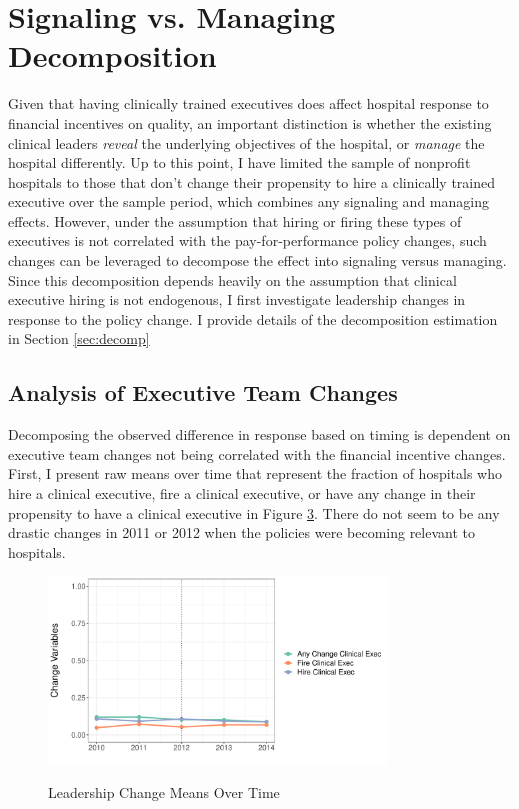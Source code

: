 \documentclass[12pt]{article}
\begin{document}
\begin{figure}[ht!]
\begin{subfigure}[b]{0.45\textwidth}
         \label{fig:mort_synth_plotc}
     \end{subfigure}
        \label{fig:mort_synth_plot}
    \end{figure}
    

\section{Signaling vs. Managing Decomposition}\label{sec:sig_man}

    Given that having clinically trained executives does affect hospital response to financial incentives on quality, an important distinction is whether the existing clinical leaders \textit{reveal} the underlying objectives of the hospital, or \textit{manage} the hospital differently. Up to this point, I have limited the sample of nonprofit hospitals to those that don't change their propensity to hire a clinically trained executive over the sample period, which combines any signaling and managing effects. However, under the assumption that hiring or firing these types of executives is not correlated with the pay-for-performance policy changes, such changes can be leveraged to decompose the effect into signaling versus managing. Since this decomposition depends heavily on the assumption that clinical executive hiring is not endogenous, I first investigate leadership changes in response to the policy change. I provide details of the decomposition estimation in Section \ref{sec:decomp}

    \subsection{Analysis of Executive Team Changes} \label{sec:changes}

    Decomposing the observed difference in response based on timing is dependent on executive team changes not being correlated with the financial incentive changes. First, I present raw means over time that represent the fraction of hospitals who hire a clinical executive, fire a clinical executive, or have any change in their propensity to have a clinical executive in Figure \ref{fig:change_means}. There do not seem to be any drastic changes in 2011 or 2012 when the policies were becoming relevant to hospitals. 

    \begin{figure}[ht!]
    \centering
    \caption{Leadership Change Means Over Time}
    \includegraphics[width=0.8\textwidth]{Objects/change_means.pdf}
    \label{fig:change_means}
     \end{figure}
\end{document}
